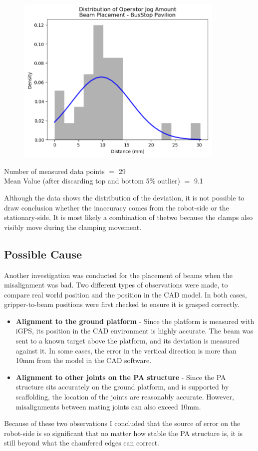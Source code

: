 \documentclass[11pt]{book}
\begin{document}
{\footnotesize \begin{figure}[H]
\includegraphics[width=10.0cm,height=8.1cm]{./images/image73.png}
\end{figure}
}

{\footnotesize Number of measured data points $=$ 29 \\ Mean Value (after discarding top and bottom 5$\%$ outlier) $=$ 9.1}

Although the data shows the distribution of the deviation, it is not possible to draw conclusion whether the inaccuracy comes from the robot-side or the stationary-side. It is most likely a combination of thetwo because the clamps also visibly move during the clamping movement. 

\subsection{Possible Cause}

Another investigation was conducted for the placement of beams when the misalignment was bad. Two different types of observations were made, to compare real world position and the position in the CAD model. In both cases, gripper-to-beam positions were first checked to ensure it is grasped correctly.

\begin{itemize}
	\item \textbf{Alignment to the ground platform} - Since the platform is measured with iGPS, its position in the CAD environment is highly accurate. The beam was sent to a known target above the platform, and its deviation is measured against it. In some cases, the error in the vertical direction is more than 10mm from the model in the CAD software. 

	\item \textbf{Alignment to other joints on the PA structure} - Since the PA structure sits accurately on the ground platform, and is supported by scaffolding, the location of the joints are reasonably accurate. However, misalignments between mating joints can also exceed 10mm. 

\end{itemize}
Because of these two observations I concluded that the source of error on the robot-side is so significant that no matter how stable the PA structure is, it is still beyond what the chamfered edges can correct. 
\end{document}
